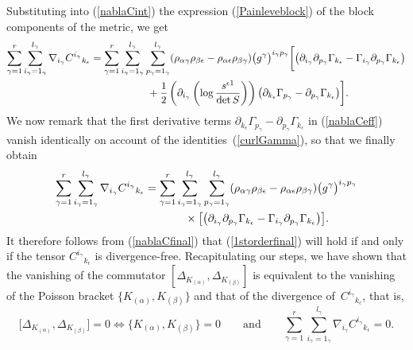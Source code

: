 \documentclass[pdftex]{sigma}
\numberwithin{equation}{section}
\newcommand{\pgamma}{p_{\gamma}}
\newcommand{\igamma}{i_{\gamma}}
\newcommand{\lgamma}{l_{\gamma}}
\newcommand{\kepsilon}{k_{\epsilon}}
\begin{document}
Substituting into (\ref{nablaCint}) the expression (\ref{Painleveblock}) of the block components of the metric, we get
\begin{gather}
\sum_{\gamma =1}^{r}\sum_{\igamma = 1_{\gamma}}^{\lgamma}\nabla_{\igamma}{C^{\igamma}}_{\kepsilon} =\sum_{\gamma =1}^{r}\sum_{\igamma = 1_{\gamma}}^{\lgamma}\sum_{\pgamma =1_{\gamma}}^{\lgamma}(\rho_{\alpha \gamma}\rho_{\beta \epsilon}-\rho_{\alpha \epsilon}\rho_{\beta \gamma})\big(g^{\gamma}\big)^{\igamma \pgamma}\bigg[\big(\partial_{\igamma}\partial_{\pgamma}\Gamma_{\kepsilon}-\Gamma_{\igamma}\partial_{\pgamma}\Gamma_{\kepsilon}\big)\nonumber\\
\hphantom{\sum_{\gamma =1}^{r}\sum_{\igamma = 1_{\gamma}}^{\lgamma}\nabla_{\igamma}{C^{\igamma}}_{\kepsilon}}{} +\frac{1}{2}\left(\partial_{\igamma}\left(\log \frac{s^{\epsilon 1}}{\det S}\right)\right)\big(\partial_{\kepsilon} \Gamma_{\pgamma}- \partial_{\pgamma}\Gamma_{\kepsilon}\big)\bigg].\label{nablaCeff}
\end{gather}
We now remark that the first derivative terms $\partial_{\kepsilon} \Gamma_{\pgamma}- \partial_{\pgamma}\Gamma_{\kepsilon}$ in (\ref{nablaCeff}) vanish identically on account of the identities~(\ref{curlGamma}), so that we finally obtain
\begin{gather}
\sum_{\gamma =1}^{r}\sum_{\igamma = 1_{\gamma}}^{\lgamma}\nabla_{\igamma}{C^{\igamma}}_{\kepsilon}=\sum_{\gamma =1}^{r}\sum_{\igamma = 1_{\gamma}}^{\lgamma}\sum_{\pgamma =1_{\gamma}}^{\lgamma}(\rho_{\alpha \gamma}\rho_{\beta \epsilon}-\rho_{\alpha \epsilon}\rho_{\beta \gamma})\big(g^{\gamma}\big)^{\igamma \pgamma}\nonumber\\
\hphantom{\sum_{\gamma =1}^{r}\sum_{\igamma = 1_{\gamma}}^{\lgamma}\nabla_{\igamma}{C^{\igamma}}_{\kepsilon}=}{}\times \big[\big(\partial_{\igamma}\partial_{\pgamma}\Gamma_{\kepsilon}-\Gamma_{\igamma}\partial_{\pgamma}\Gamma_{\kepsilon}\big)\big].\label{nablaCfinal}
\end{gather}
It therefore follows from (\ref{nablaCfinal}) that (\ref{1storderfinal}) will hold if and only if the tensor ${C^{\igamma}}_{\kepsilon}$ is divergence-free. Recapitulating our steps, we have shown that the vanishing of the commutator $[\Delta_{K_{(\alpha)}}\!{,}\Delta_{K_{(\beta)}}]\!$ is equivalent to the vanishing of the Poisson bracket $ \{K_{(\alpha)}, K_{(\beta)}\}$ and that of the divergence of~${C^{\igamma}}_{\kepsilon}$, that is,
\[
\big[\Delta_{K_{(\alpha)}},\Delta_{K_{(\beta)}}\big]=0 \iff \big\{K_{(\alpha)}, K_{(\beta)}\big\}=0\qquad \text{and} \qquad \sum_{\gamma =1}^{r}\sum_{\igamma = 1_{\gamma}}^{\lgamma}\nabla_{\igamma}{C^{\igamma}}_{\kepsilon}=0.
\]
\end{document}
